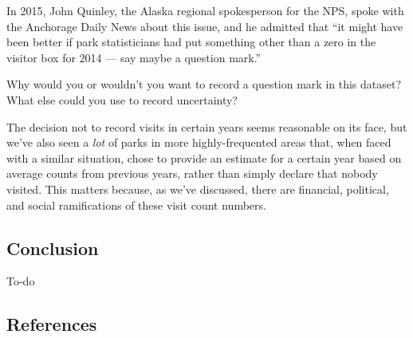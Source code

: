 \documentclass[
  letterpaper,
  DIV=11,
  numbers=noendperiod]{scrartcl}
\begin{document}
In 2015, John Quinley, the Alaska regional spokesperson for the NPS,
spoke with the Anchorage Daily News about this issue, and he admitted
that ``it might have been better if park statisticians had put something
other than a zero in the visitor box for 2014 --- say maybe a question
mark.''

\begin{tcolorbox}[enhanced jigsaw, bottomrule=.15mm, colback=white, colbacktitle=quarto-callout-tip-color!10!white, coltitle=black, titlerule=0mm, leftrule=.75mm, toprule=.15mm, opacitybacktitle=0.6, colframe=quarto-callout-tip-color-frame, opacityback=0, rightrule=.15mm, breakable, bottomtitle=1mm, toptitle=1mm, title=\textcolor{quarto-callout-tip-color}{\faLightbulb}\hspace{0.5em}{Discussion}, left=2mm, arc=.35mm]

Why would you or wouldn't you want to record a question mark in this
dataset? What else could you use to record uncertainty?

\end{tcolorbox}

The decision not to record visits in certain years seems reasonable on
its face, but we've also seen a \emph{lot} of parks in more
highly-frequented areas that, when faced with a similar situation, chose
to provide an estimate for a certain year based on average counts from
previous years, rather than simply declare that nobody visited. This
matters because, as we've discussed, there are financial, political, and
social ramifications of these visit count numbers.

\subsection{Conclusion}\label{conclusion}

To-do

\subsection{References}\label{references}
\end{document}

